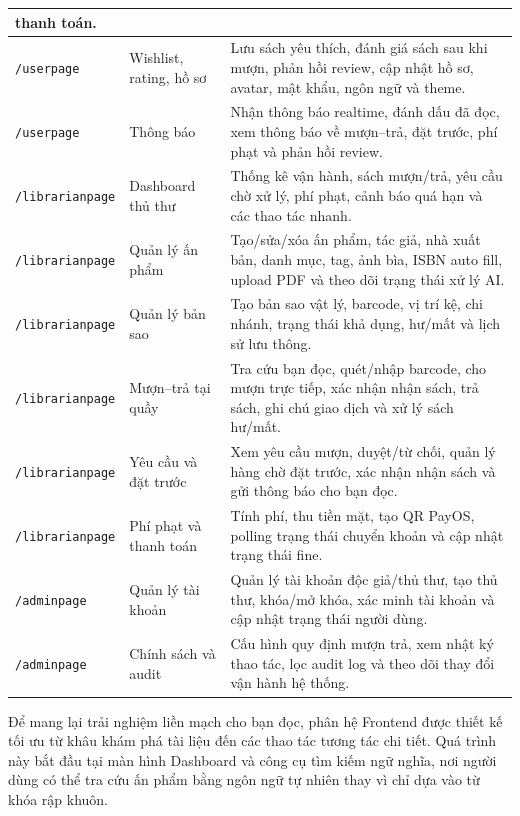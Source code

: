 \begin{longtable}{|p{2.9cm}|p{4.2cm}|p{7.2cm}|}
thanh toán. \\
\hline
\texttt{/userpage} & Wishlist, rating, hồ sơ &
Lưu sách yêu thích, đánh giá sách sau khi mượn, phản hồi review, cập nhật hồ sơ,
avatar, mật khẩu, ngôn ngữ và theme. \\
\hline
\texttt{/userpage} & Thông báo &
Nhận thông báo realtime, đánh dấu đã đọc, xem thông báo về mượn--trả, đặt trước,
phí phạt và phản hồi review. \\
\hline
\texttt{/librarianpage} & Dashboard thủ thư &
Thống kê vận hành, sách mượn/trả, yêu cầu chờ xử lý, phí phạt, cảnh báo quá hạn
và các thao tác nhanh. \\
\hline
\texttt{/librarianpage} & Quản lý ấn phẩm &
Tạo/sửa/xóa ấn phẩm, tác giả, nhà xuất bản, danh mục, tag, ảnh bìa, ISBN auto
fill, upload PDF và theo dõi trạng thái xử lý AI. \\
\hline
\texttt{/librarianpage} & Quản lý bản sao &
Tạo bản sao vật lý, barcode, vị trí kệ, chi nhánh, trạng thái khả dụng, hư/mất
và lịch sử lưu thông. \\
\hline
\texttt{/librarianpage} & Mượn--trả tại quầy &
Tra cứu bạn đọc, quét/nhập barcode, cho mượn trực tiếp, xác nhận nhận sách, trả
sách, ghi chú giao dịch và xử lý sách hư/mất. \\
\hline
\texttt{/librarianpage} & Yêu cầu và đặt trước &
Xem yêu cầu mượn, duyệt/từ chối, quản lý hàng chờ đặt trước, xác nhận nhận sách
và gửi thông báo cho bạn đọc. \\
\hline
\texttt{/librarianpage} & Phí phạt và thanh toán &
Tính phí, thu tiền mặt, tạo QR PayOS, polling trạng thái chuyển khoản và cập
nhật trạng thái fine. \\
\hline
\texttt{/adminpage} & Quản lý tài khoản &
Quản lý tài khoản độc giả/thủ thư, tạo thủ thư, khóa/mở khóa, xác minh tài
khoản và cập nhật trạng thái người dùng. \\
\hline
\texttt{/adminpage} & Chính sách và audit &
Cấu hình quy định mượn trả, xem nhật ký thao tác, lọc audit log và theo dõi thay
đổi vận hành hệ thống. \\
\hline
\end{longtable}

Để mang lại trải nghiệm liền mạch cho bạn đọc, phân hệ Frontend được thiết kế tối ưu từ khâu khám phá tài liệu đến các thao tác tương tác chi tiết. Quá trình này bắt đầu tại màn hình Dashboard và công cụ tìm kiếm ngữ nghĩa, nơi người dùng có thể tra cứu ấn phẩm bằng ngôn ngữ tự nhiên thay vì chỉ dựa vào từ khóa rập khuôn.

